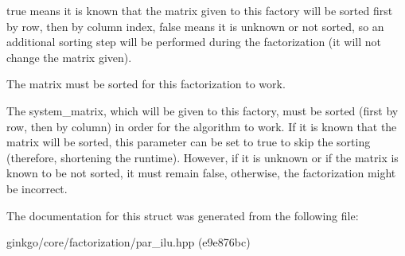 {\ttfamily true} means it is known that the matrix given to this factory will be sorted first by row, then by column index, {\ttfamily false} means it is unknown or not sorted, so an additional sorting step will be performed during the factorization (it will not change the matrix given). 

The matrix must be sorted for this factorization to work.

The {\ttfamily system\+\_\+matrix}, which will be given to this factory, must be sorted (first by row, then by column) in order for the algorithm to work. If it is known that the matrix will be sorted, this parameter can be set to {\ttfamily true} to skip the sorting (therefore, shortening the runtime). However, if it is unknown or if the matrix is known to be not sorted, it must remain {\ttfamily false}, otherwise, the factorization might be incorrect. 

The documentation for this struct was generated from the following file\+:\begin{DoxyCompactItemize}
\item 
ginkgo/core/factorization/par\+\_\+ilu.\+hpp (e9e876bc)\end{DoxyCompactItemize}
